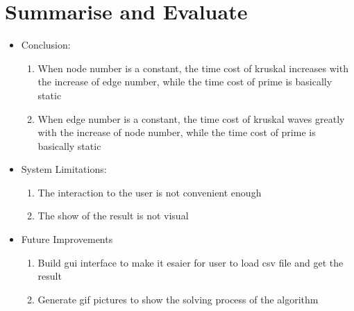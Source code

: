 





\section{Summarise and Evaluate}


\begin{itemize}
    \item Conclusion:
    \begin{enumerate}
        \item When node number is a constant, the time cost of kruskal increases with the increase of edge 
        number, while the time cost of prime is basically static
        \item  When edge number is a constant, the time cost of kruskal waves greatly with the increase of node 
        number, while the time cost of prime is basically static
    \end{enumerate}
    \item System Limitations:
        \begin{enumerate}
            \item The interaction to the user is not convenient enough
            \item The show of the result is not visual
        \end{enumerate}
    \item Future Improvements
        \begin{enumerate}
            \item Build gui interface to make it esaier for user to load csv file and get the result
            \item Generate gif pictures to show the solving process of the algorithm
        \end{enumerate}
\end{itemize}